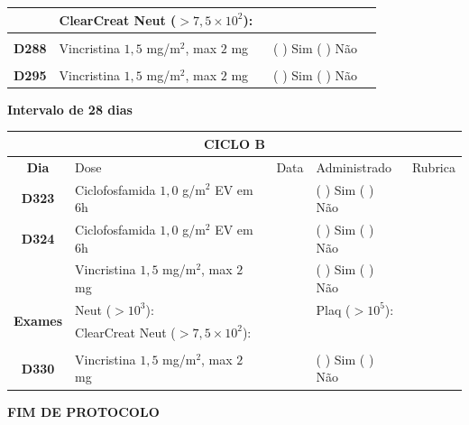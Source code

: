 \documentclass[11pt,a4paper,oldfontcommands]{memoir}
\begin{document}
\begin{center}
\begin{table}[H]
\begin{tabular}{p{1cm}p{6cm}|p{1cm}|p{3cm}|p{2.5cm}}
    \cline{2-5}
    \multicolumn{1}{c|}{\multirow{2}{*}{{}}}&\multicolumn{2}{l|}{ClearCreat Neut (\(>7,5\times10^2\)):}&{}&{}\\
    \hline
    \\
    \hline
    \multicolumn{1}{c|}{\multirow{1}{*}{\textbf{D288}}}&{Vincristina \(1,5\) mg/m\(^2\), max \(2\) mg}&&{(  ) Sim (  ) Não}&\\
    \hline
    \\
    \hline
    \multicolumn{1}{c|}{\multirow{1}{*}{\textbf{D295}}}&{Vincristina \(1,5\) mg/m\(^2\), max \(2\) mg}&&{(  ) Sim (  ) Não}&\\
    \hline
    \end{tabular}
    \end{table}
    \textbf{Intervalo de 28 dias}
    \begin{table}[H]
    \begin{tabular}{p{1cm}p{6cm}|p{1cm}|p{3cm}|p{2.5cm}}
    \hline
	\multicolumn{5}{c}{\textbf{CICLO B}}\\
	\hline
    \multicolumn{1}{c|}{\multirow{1}{*}{\textbf{Dia}}}&{Dose}&{Data}&{Administrado}&{Rubrica} \\
    \hline
    \multicolumn{1}{c|}{\multirow{1}{*}{\textbf{D323}}}&{Ciclofosfamida \(1,0\) g/m\(^2\) EV em 6h}&&{(  ) Sim (  ) Não}&\\
    \multicolumn{1}{c|}{\multirow{1}{*}{\textbf{D324}}}&{Ciclofosfamida \(1,0\) g/m\(^2\) EV em 6h}&&{(  ) Sim (  ) Não}&\\
    \multicolumn{1}{c|}{\multirow{1}{*}{\textbf{}}}&{Vincristina \(1,5\) mg/m\(^2\), max \(2\) mg}&&{(  ) Sim (  ) Não}&\\
    \hline
    \multicolumn{1}{c|}{\multirow{2}{*}{\textbf{Exames}}}&\multicolumn{2}{l|}{Neut (\(>10^3\)):}&{Plaq (\(>10^5\)):}&\\
    \cline{2-5}
    \multicolumn{1}{c|}{\multirow{2}{*}{{}}}&\multicolumn{2}{l|}{ClearCreat  Neut (\(>7,5\times10^2\)):}&{}&{}\\
    \hline
   \\
    \hline
    \multicolumn{1}{c|}{\multirow{1}{*}{\textbf{D330}}}&{Vincristina \(1,5\) mg/m\(^2\), max \(2\) mg}&&{(  ) Sim (  ) Não}&\\
    \hline
\end{tabular}
\end{table}
\textbf{FIM DE PROTOCOLO}

\end{center}
\end{document}
